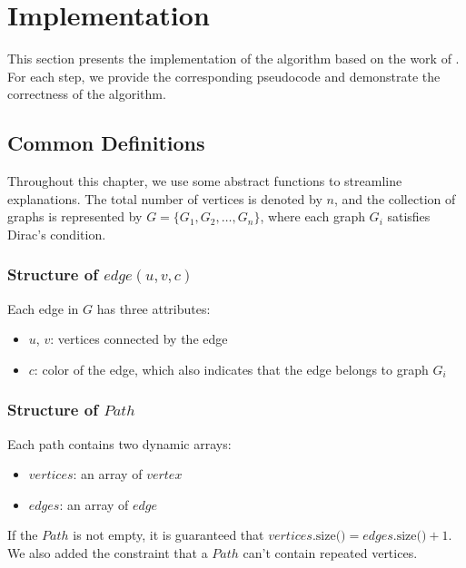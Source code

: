 
\chapter{Implementation}

This section presents the implementation of the algorithm based on the work of \cite{Joos_2020}. For each step, we provide the corresponding pseudocode and demonstrate the correctness of the algorithm.

\section{Common Definitions}

Throughout this chapter, we use some abstract functions to streamline explanations. The total number of vertices is denoted by $n$, and the collection of graphs is represented by $G = \{G_1, G_2, \dots, G_n\}$, where each graph $G_i$ satisfies Dirac's condition.

\subsection{Structure of $edge(u, v, c)$}

Each edge in $G$ has three attributes:

\begin{itemize}
    \item $u$, $v$: vertices connected by the edge
    \item $c$: color of the edge, which also indicates that the edge belongs to graph $G_i$
\end{itemize}

\subsection{Structure of $Path$}

Each path contains two dynamic arrays:

\begin{itemize}
    \item $vertices$: an array of $vertex$
    \item $edges$: an array of $edge$
\end{itemize}

If the $Path$ is not empty, it is guaranteed that 
$vertices\text{.size()} = edges\text{.size()} + 1$. We 
also added the constraint that a $Path$ can't contain repeated 
vertices.

